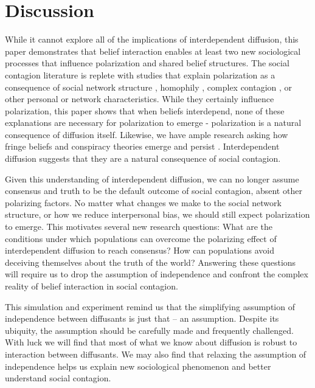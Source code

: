 \documentclass[9pt,twocolumn,twoside,lineno]{pnas-new}
\begin{document}
\section*{Discussion}
While it cannot explore all of the implications of interdependent diffusion, this paper demonstrates that belief interaction enables at least two new sociological processes that influence polarization and shared belief structures. The social contagion literature is replete with studies that explain polarization as a consequence of social network structure \cite{flache2011small,del2016echo}, homophily \cite{dandekar2013biased,vasconcelos2019consensus,axelrod-1997-dissemination}, complex contagion \cite{spohr2017fake,tornberg2018echo}, or other personal or network characteristics. While they certainly influence polarization, this paper shows that when beliefs interdepend, none of these explanations are necessary for polarization to emerge - polarization is a natural consequence of diffusion itself. Likewise, we have ample research asking how fringe beliefs and conspiracy theories emerge and persist \cite{spohr2017fake,tornberg2018echo,pennycook2019lazy}. Interdependent diffusion suggests that they are a natural consequence of social contagion. 

Given this understanding of interdependent diffusion, we can no longer assume consensus and truth to be the default outcome of social contagion, absent other polarizing factors. No matter what changes we make to the social network structure, or how we reduce interpersonal bias, we should still expect polarization to emerge. This motivates several new research questions: What are the conditions under which populations can overcome the polarizing effect of interdependent diffusion to reach consensus? How can populations avoid deceiving themselves about the truth of the world? Answering these questions will require us to drop the assumption of independence and confront the complex reality of belief interaction in social contagion.

This simulation and experiment remind us that the simplifying assumption of independence between diffusants is just that – an assumption. Despite its ubiquity, the assumption should be carefully made and frequently challenged. With luck we will find that most of what we know about diffusion is robust to interaction between diffusants. We may also find that relaxing the assumption of independence helps us explain new sociological phenomenon and better understand social contagion.
\end{document}
